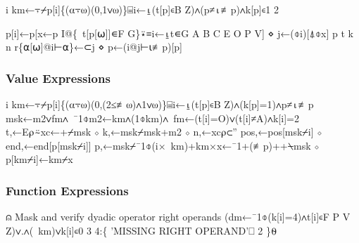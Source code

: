 \documentclass{article}%
\begin{document}
\nwenddocs{}\endmoddef\nwstartdeflinemarkup{}\nwenddeflinemarkup
i km←⍪⌿p[i]\{(⍺⍪⍵)(0,1∨⍵)\}⌸i←⍸(t[p]∊B Z)∧(p≠⍳≢p)∧k[p]∊1 2
\nwendcode{}\nwdocspar

\nwenddocs{}\endmoddef\nwstartdeflinemarkup{}\nwenddeflinemarkup
p[i]←p[x←p I@\{~t[p[⍵]]∊F G\}⍣≡i←⍸t∊G A B C E O P V] ⋄ j←(⌽i)[⍋⌽x]
p t k n r\{⍺[⍵]@i⊢⍺\}←⊂j ⋄ p←(i@j⊢⍳≢p)[p]
\nwendcode{}\nwdocspar

\subsubsection{Value Expressions}

\nwenddocs{}\endmoddef\nwstartdeflinemarkup{}\nwenddeflinemarkup
i km←⍪⌿p[i]\{(⍺⍪⍵)(0,(2≤≢⍵)∧1∨⍵)\}⌸i←⍸(t[p]∊B Z)∧(k[p]=1)∧p≠⍳≢p
msk←m2∨fm∧~¯1⌽m2←km∧(1⌽km)∧~fm←(t[i]=O)∨(t[i]≠A)∧k[i]=2
t,←E⍴⍨xc←+⌿msk ⋄ k,←msk⌿msk+m2 ⋄ n,←xc⍴⊂''
pos,←pos[msk⌿i] ⋄ end,←end[p[msk⌿i]]
p,←msk⌿¯1⌽(i×~km)+km×x←¯1+(≢p)++⍀msk ⋄ p[km⌿i]←km⌿x
\nwendcode{}\nwdocspar

\subsubsection{Function Expressions}

\nwenddocs{}\endmoddef\nwstartdeflinemarkup{}\nwenddeflinemarkup
⍝ Mask and verify dyadic operator right operands
(dm←¯1⌽(k[i]=4)∧t[i]∊F P V Z)∨.∧(~km)∨k[i]∊0 3 4:\{
        'MISSING RIGHT OPERAND'⎕ 2
\}⍬
\end{document}
